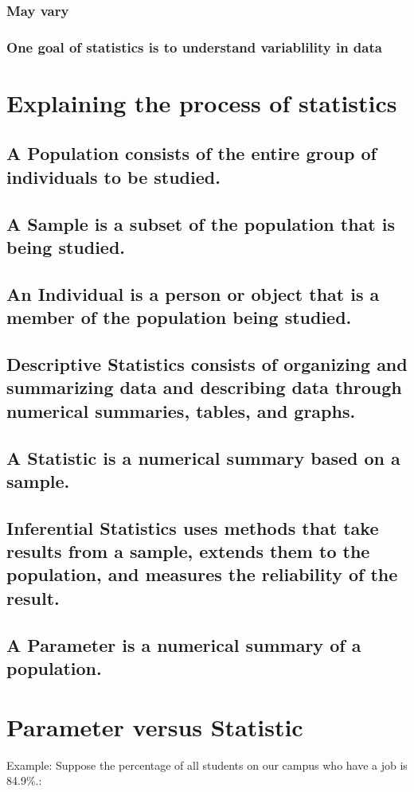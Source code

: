 \documentclass[11pt]{article}
\begin{document}
\subsubsection{May vary}
\label{sec:orgde41f28}
\subsubsection{One goal of statistics is to understand variablility in data}
\label{sec:orgdd53004}
\section{Explaining the process of statistics}
\label{sec:orgbd5d95e}

\subsection{A \textbf{Population} consists of the entire group of individuals to be studied.}
\label{sec:org9e226ae}

\subsection{A \textbf{Sample} is a subset of the population that is being studied.}
\label{sec:org386033d}

\subsection{An \textbf{Individual} is a person or object that is a member of the population being studied.}
\label{sec:org2811ca2}

\subsection{\textbf{Descriptive Statistics} consists of organizing and summarizing data and describing data through numerical summaries, tables, and graphs.}
\label{sec:org606f6c3}

\subsection{A \textbf{Statistic} is a numerical summary based on a \textbf{sample}.}
\label{sec:org6c1f717}

\subsection{\textbf{Inferential Statistics} uses methods that take results from a sample, extends them to the population, and measures the reliability of the result.}
\label{sec:org6ac057a}

\subsection{A \textbf{Parameter} is a numerical summary of a population.}
\label{sec:org30bf267}
\section{Parameter versus Statistic}
\label{sec:org1564120}

Example: Suppose the percentage of all students on our campus who have a job is 84.9\%.:
\end{document}
